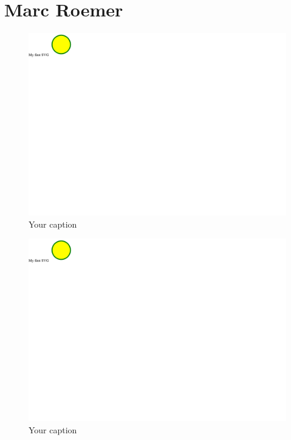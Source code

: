 \documentclass{article}
\begin{document}
\section{Marc Roemer}
\begin{figure}[h!]
    \centering
    \captionsetup{labelformat=empty}
    \caption{Your caption}
    \includegraphics[width=\textwidth, angle=0]{Kreis2.pdf}
\end{figure}
\newpage
\begin{figure}[h!]
    \centering
    \captionsetup{labelformat=empty}
    \caption{Your caption}
    \includegraphics[width=\textwidth, angle=0]{Kreis2.pdf}
\end{figure}
\newpage
\end{document}
